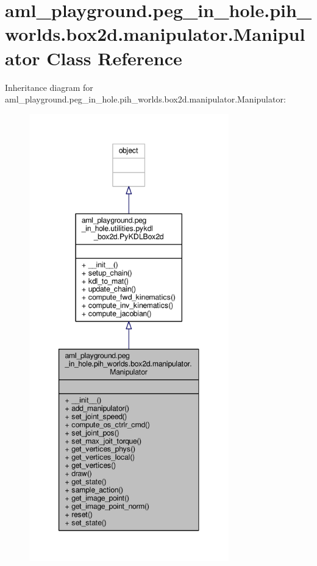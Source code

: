 \hypertarget{classaml__playground_1_1peg__in__hole_1_1pih__worlds_1_1box2d_1_1manipulator_1_1_manipulator}{\section{aml\-\_\-playground.\-peg\-\_\-in\-\_\-hole.\-pih\-\_\-worlds.\-box2d.\-manipulator.\-Manipulator Class Reference}
\label{classaml__playground_1_1peg__in__hole_1_1pih__worlds_1_1box2d_1_1manipulator_1_1_manipulator}
}


Inheritance diagram for aml\-\_\-playground.\-peg\-\_\-in\-\_\-hole.\-pih\-\_\-worlds.\-box2d.\-manipulator.\-Manipulator\-:\nopagebreak
\begin{figure}[H]
\begin{center}
\leavevmode
\includegraphics[height=550pt]{classaml__playground_1_1peg__in__hole_1_1pih__worlds_1_1box2d_1_1manipulator_1_1_manipulator__inherit__graph}
\end{center}
\end{figure}


